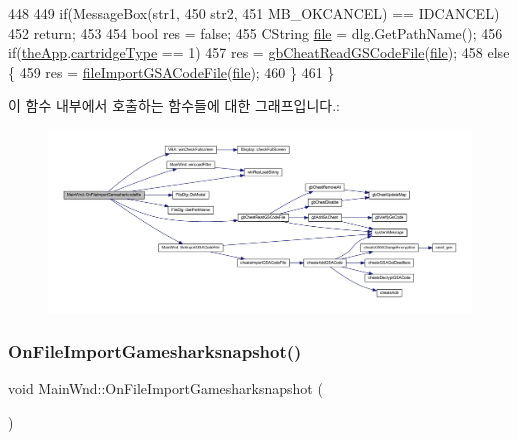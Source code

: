 \begin{DoxyCode}
448 
449   \textcolor{keywordflow}{if}(MessageBox(str1,
450                 str2,
451                 MB\_OKCANCEL) == IDCANCEL)
452     \textcolor{keywordflow}{return};
453   
454   \textcolor{keywordtype}{bool} res = \textcolor{keyword}{false};
455   CString \mbox{\hyperlink{expr-lex_8cpp_a702945180aa732857b380a007a7e2a21}{file}} = dlg.GetPathName();
456   \textcolor{keywordflow}{if}(\mbox{\hyperlink{_v_b_a_8cpp_a8095a9d06b37a7efe3723f3218ad8fb3}{theApp}}.\mbox{\hyperlink{class_v_b_a_af300759fcbc7eeb00ce73f956fc5ddb7}{cartridgeType}} == 1)
457     res = \mbox{\hyperlink{gb_cheats_8cpp_a38377cd690473f3f0ec0dca22adec1ff}{gbCheatReadGSCodeFile}}(\mbox{\hyperlink{expr-lex_8cpp_a702945180aa732857b380a007a7e2a21}{file}});
458   \textcolor{keywordflow}{else} \{
459     res = \mbox{\hyperlink{class_main_wnd_af376f9dd20c49c2b0543102e321ea79c}{fileImportGSACodeFile}}(\mbox{\hyperlink{expr-lex_8cpp_a702945180aa732857b380a007a7e2a21}{file}});
460   \}
461 \}
\end{DoxyCode}
이 함수 내부에서 호출하는 함수들에 대한 그래프입니다.\+:
\nopagebreak
\begin{figure}[H]
\begin{center}
\leavevmode
\includegraphics[width=350pt]{class_main_wnd_a3e7abf73687cb0dbf61c3707de5e10f4_cgraph}
\end{center}
\end{figure}
\mbox{\label{class_main_wnd_a1ba9d10fce306e309613d8e06097219c}} 
\subsubsection{\texorpdfstring{On\+File\+Import\+Gamesharksnapshot()}{OnFileImportGamesharksnapshot()}}
{\footnotesize\ttfamily void Main\+Wnd\+::\+On\+File\+Import\+Gamesharksnapshot (\begin{DoxyParamCaption}{ }\end{DoxyParamCaption})\hspace{0.3cm}{\ttfamily [protected]}}



